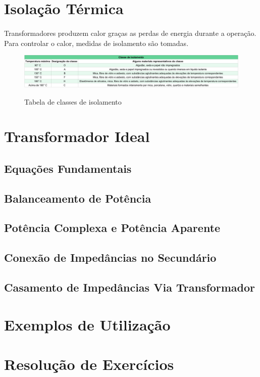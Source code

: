 \documentclass[a4paper, 12pt]{article}
\begin{document}
\section{Isolação Térmica}
\paragraph{}Transformadores produzem calor graças as perdas de energia durante a operação. Para controlar o calor, medidas de isolamento são tomadas.
\begin{figure}[hbt!]
    \hspace{-3cm}\includegraphics[scale=0.75]{tabelaTemps.pdf}\label{tabelatemps}
    \caption{Tabela de classes de isolamento}
\end{figure}
\newpage
\section{Transformador Ideal}
    \subsection{Equações Fundamentais}
    \subsection{Balanceamento de Potência}
    \subsection{Potência Complexa e Potência Aparente}
    \subsection{Conexão de Impedâncias no Secundário}
    \subsection{Casamento de Impedâncias Via Transformador} \label{impedCas}
\newpage
\section{Exemplos de Utilização}
\newpage
\section{Resolução de Exercícios}
\newpage
\end{document}
